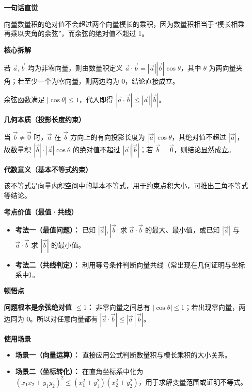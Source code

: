 \begin{explanationbox}
	\textbf{\textcolor{CExplanation}{一句话直觉}}

	向量数量积的绝对值不会超过两个向量模长的乘积，因为数量积相当于“模长相乘再乘以夹角的余弦”，而余弦的绝对值不超过 1。

	\medskip
	\textbf{\textcolor{CExplanation}{核心拆解}}

	\begin{description}[style=nextline, leftmargin=2.8em, labelsep=0.5em, itemsep=0.45em]
		\item[\textbf{要点一（投影与夹角）：}]
		      若 $\vec{a},\vec{b}$ 均为非零向量，则由数量积定义 $\vec{a}\cdot\vec{b}=|\vec{a}||\vec{b}|\cos\theta$，其中 $\theta$ 为两向量夹角；若至少一个为零向量，则两边均为 $0$，结论直接成立。
		\item[\textbf{要点二（余弦有界性）：}]
		      余弦函数满足 $|\cos\theta|\le 1$，代入即得 $|\vec{a}\cdot\vec{b}| \le |\vec{a}||\vec{b}|$。
	\end{description}

	\medskip
	\textbf{\textcolor{CExplanation}{几何本质（投影长度约束）}}

	当 $\vec{b}\neq\vec{0}$ 时，$\vec{a}$ 在 $\vec{b}$ 方向上的有向投影长度为 $|\vec{a}|\cos\theta$，其绝对值不超过 $|\vec{a}|$，故数量积 $|\vec{b}|\cdot |\vec{a}|\cos\theta$ 的绝对值不超过 $|\vec{a}||\vec{b}|$；若 $\vec{b}=\vec{0}$，则结论显然成立。

	\medskip
	\textbf{\textcolor{CExplanation}{代数意义（基本不等式约束）}}

	该不等式是向量内积空间中的基本不等式，用于约束点积大小，可推出三角不等式等结论。

	\medskip
	\textbf{\textcolor{CExplanation}{考点价值（最值·共线）}}

	\begin{itemize}[leftmargin=*, itemsep=0.5em, topsep=0.4em]
		\item \textbf{考法一（最值问题）：} 已知 $|\vec{a}|,|\vec{b}|$ 求 $\vec{a}\cdot\vec{b}$ 的最大、最小值，或已知 $|\vec{a}|$ 与 $\vec{a}\cdot\vec{b}$ 求 $|\vec{b}|$ 的最小值。
		\item \textbf{考法二（共线判定）：} 利用等号条件判断向量共线（常出现在几何证明与坐标系中）。
	\end{itemize}

	\medskip
	\textbf{\textcolor{CExplanation}{顿悟点}}

	\textbf{问题根本是余弦绝对值 $\le 1$：} 非零向量之间总有 $|\cos\theta|\le 1$；若出现零向量，两边同为 $0$。所以对任意向量都有 $|\vec{a}\cdot\vec{b}| \le |\vec{a}||\vec{b}|$。

	\medskip
	\textbf{\textcolor{CExplanation}{使用场景}}

	\begin{itemize}[leftmargin=*, itemsep=0.5em, topsep=0.4em]
		\item \textbf{场景一（向量运算）：} 直接应用公式判断数量积与模长乘积的大小关系。
		\item \textbf{场景二（坐标转化）：} 在直角坐标系中化为 $(x_1x_2+y_1y_2)^2 \le (x_1^2+y_1^2)(x_2^2+y_2^2)$，用于求解变量范围或证明不等式。
	\end{itemize}
\end{explanationbox}